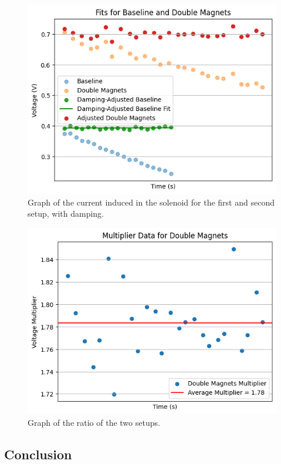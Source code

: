 \documentclass[11pt]{article}
\begin{document}
    \begin{figure}[H]
        \centering
        \includegraphics[width=0.8\linewidth]{resources/images/part1c damping}
        \caption{Graph of the current induced in the solenoid for the first and second setup, with damping.}
        \label{fig:part1c_damping}
    \end{figure}

    \begin{figure}[H]
        \centering
        \includegraphics[width=0.8\linewidth]{resources/images/part1c ratios}
        \caption{Graph of the ratio of the two setups.}
        \label{fig:part1c_ratios}
    \end{figure}


    \subsection{Conclusion}\label{subsec:part_1_conclusion}
\end{document}
